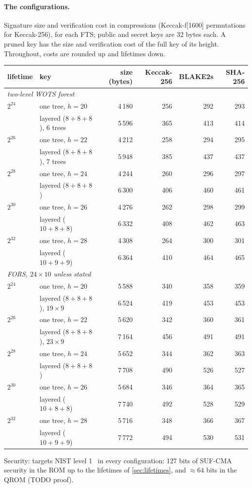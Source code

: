 \documentclass[11pt]{article}
\begin{document}
\paragraph{The configurations.} Signature size and verification cost in compressions (Keccak-f[1600]
permutations for Keccak-256), for each FTS; public and secret keys are 32 bytes each. A pruned key has the size and
verification cost of the full key of its height. Throughout, costs are rounded up and lifetimes down.
\begin{center}
\begin{tabular}{llrrrr}
  \toprule
  lifetime & key & size (bytes) & Keccak-256 & BLAKE2s & SHA-256 \\
  \midrule
  \multicolumn{6}{l}{\emph{two-level WOTS forest}} \\
  $2^{24}$ & one tree, $h=20$ & 4\,180 & 256 & 292 & 293 \\
   & layered ($8+8+8$), 6 trees & 5\,596 & 365 & 413 & 414 \\
  $2^{26}$ & one tree, $h=22$ & 4\,212 & 258 & 294 & 295 \\
   & layered ($8+8+8$), 7 trees & 5\,948 & 385 & 437 & 437 \\
  $2^{28}$ & one tree, $h=24$ & 4\,244 & 260 & 296 & 297 \\
   & layered ($8+8+8$) & 6\,300 & 406 & 460 & 461 \\
  $2^{30}$ & one tree, $h=26$ & 4\,276 & 262 & 298 & 299 \\
   & layered ($10+8+8$) & 6\,332 & 408 & 462 & 463 \\
  $2^{32}$ & one tree, $h=28$ & 4\,308 & 264 & 300 & 301 \\
   & layered ($10+9+9$) & 6\,364 & 410 & 464 & 465 \\
  \midrule
  \multicolumn{6}{l}{\emph{FORS, $24\times10$ unless stated}} \\
  $2^{24}$ & one tree, $h=20$ & 5\,588 & 340 & 358 & 359 \\
   & layered ($8+8+8$), $19\times9$ & 6\,524 & 419 & 453 & 453 \\
  $2^{26}$ & one tree, $h=22$ & 5\,620 & 342 & 360 & 361 \\
   & layered ($8+8+8$), $23\times9$ & 7\,164 & 456 & 491 & 491 \\
  $2^{28}$ & one tree, $h=24$ & 5\,652 & 344 & 362 & 363 \\
   & layered ($8+8+8$) & 7\,708 & 490 & 526 & 527 \\
  $2^{30}$ & one tree, $h=26$ & 5\,684 & 346 & 364 & 365 \\
   & layered ($10+8+8$) & 7\,740 & 492 & 528 & 529 \\
  $2^{32}$ & one tree, $h=28$ & 5\,716 & 348 & 366 & 367 \\
   & layered ($10+9+9$) & 7\,772 & 494 & 530 & 531 \\
  \bottomrule
\end{tabular}
\end{center}
Security: targets NIST level 1~\cite{FIPS205} in every configuration: 127 bits of SUF-CMA security in the ROM up to the
lifetimes of \cref{sec:lifetimes}, and $\approx 64$ bits in the QROM (TODO proof).
\end{document}
